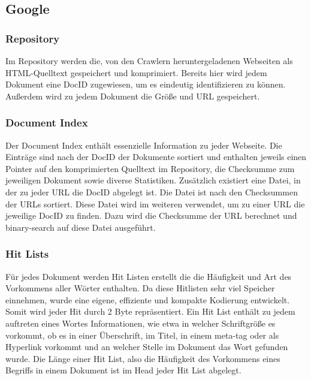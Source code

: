 \documentclass[12pt, a4paper]{llncs}
\begin{document}
	\subsection{Google}
	
	
	\subsubsection{Repository}
	Im Repository werden die, von den Crawlern heruntergeladenen Webseiten als HTML-Quelltext gespeichert und komprimiert. Bereits hier wird jedem Dokument
	eine DocID zugewiesen, um es eindeutig identifizieren zu können. Außerdem wird zu jedem Dokument die Größe und URL gespeichert\cite{page98}.

	\subsubsection{Document Index}
	Der Document Index enthält essenzielle Information zu jeder Webseite. Die Einträge sind nach der DocID der Dokumente sortiert und enthalten jeweils einen
	Pointer auf den komprimierten Quelltext im Repository, die Checksumme zum jeweiligen Dokument sowie diverse Statistiken. Zusätzlich existiert eine Datei, in
	der zu jeder URL die DocID abgelegt ist. Die Datei ist nach den Checksummen der URLs sortiert. Diese Datei wird im weiteren verwendet, um zu einer URL die
	jeweilige DocID zu finden. Dazu wird die Checksumme der URL berechnet und binary-search auf diese Datei ausgeführt\cite{page98}.
	
	\subsubsection{Hit Lists}
	Für jedes Dokument werden Hit Listen erstellt die die Häufigkeit und Art des Vorkommens aller Wörter enthalten. Da diese Hitlisten sehr viel Speicher einnehmen,
	wurde eine eigene, effiziente und kompakte Kodierung entwickelt. Somit wird jeder Hit durch 2 Byte repräsentiert. Ein Hit List enthält zu jedem auftreten eines Wortes
	Informationen, wie etwa in welcher Schriftgröße es vorkommt, ob es in einer Überschrift, im Titel, in einem meta-tag oder als Hyperlink vorkommt und an welcher Stelle
	im Dokument das Wort gefunden wurde. Die Länge einer Hit List, also die Häufigkeit des Vorkommens eines Begriffs in einem Dokument ist im Head jeder Hit List abgelegt\cite{page98}.
	
\end{document}
